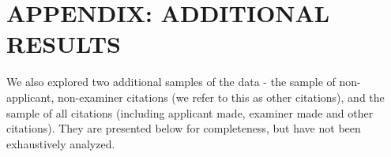 \documentclass[12pt,letterpaper]{article}
\renewcommand{\figureplace}{
    \begin{center}
    \begin{singlespace}
    ------------------------------------\\
    Insert \figurename \ \thepostfig\ about here.\\
    ------------------------------------
    \end{singlespace}
    \end{center}}
\renewcommand{\tableplace}{%
    \begin{center}
    \begin{singlespace}
    ------------------------------------\\
    Insert \tablename \ \theposttbl\ about here.\\
    ------------------------------------
    \end{singlespace}
    \end{center}}
\begin{document}
\makeatletter
\renewcommand{\thepostfigure}{\Alph{section}\arabic{postfigure}}
\setcounter{postfigure}{0}
\renewcommand{\theposttable}{\Alph{section}\arabic{posttable}}
\setcounter{posttable}{0}
  \renewcommand{\figureplace}{
    \begin{center}
    \begin{singlespace}
    ------------------------------------\\
    Insert \figurename \ A\thepostfigure\ about here.\\
    ------------------------------------
    \end{singlespace}
    \end{center}}
  \renewcommand{\tableplace}{%
    \begin{center}
    \begin{singlespace}
    ------------------------------------\\
    Insert \tablename \ A\theposttable\ about here.\\
    ------------------------------------
    \end{singlespace}
    \end{center}}
\makeatother

\section{APPENDIX: ADDITIONAL RESULTS}
We also explored two additional samples of the data - the sample of non-applicant, non-examiner citations (we refer to this as other citations), and the sample of all citations (including applicant made, examiner made and other citations). They are presented below for completeness, but have not been exhaustively analyzed. \par
\end{document}
